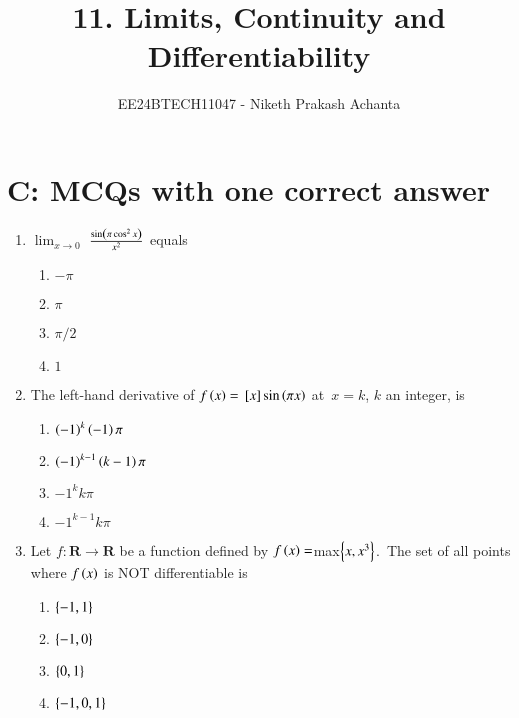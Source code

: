 \documentclass[journal,12pt,onecolumn]{IEEEtran}
\theoremstyle{remark}
\begin{document}

\vspace{3cm}

\title{11. Limits, Continuity and Differentiability}
\author{EE24BTECH11047 - Niketh Prakash Achanta}
\maketitle
\bigskip
\section{C: MCQs with one correct answer}

\renewcommand{\thefigure}{\theenumi}
\renewcommand{\thetable}{\theenumi}
\begin{enumerate}
\item %

	$\lim_{x\to0}$  $\frac{\sin\left(\pi \cos^2 x \right)}{x^2}$ \: equals \hfill{}
    \begin{enumerate}
     \item $-\pi$
     \item $\pi$
     \item $\pi/2$
     \item $1$\\
     \end{enumerate}

\item %
	The left-hand derivative of $f\left(x\right)={}\left[x\right]\sin\left(\pi x\right)$ at\ $x=k$, $k$ an integer, is \hfill{}
    \begin{enumerate}
	    \item $\left(-1\right)^k \left(-1\right) \pi$
	    \item $\left(-1\right)^{k-1}\left(k-1\right) \pi$
            \item $-1^k k\pi$
     	    \item $-1^{k-1} k\pi$\\
    \end{enumerate}

\item %

	Let $f:\mathbf{R}\rightarrow\mathbf{R}$ be a function defined by $f\left(x\right)=$max$\left\{x,x^3\right\}$.\ The set of all points where $f\left(x\right)$ is NOT differentiable is \hfill{}
    \begin{enumerate}
     \item $\left\{-1,1\right\}$
     \item $\left\{-1,0\right\}$
     \item $\left\{0,1\right\}$
     \item $\left\{-1,0,1\right\}$\\
    \end{enumerate}



\end{enumerate}
\end{document}
